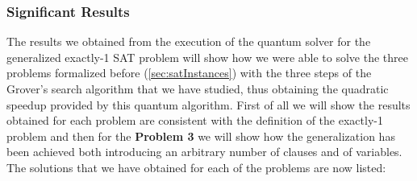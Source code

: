 \documentclass[english]{article}
\begin{document}
			\subsubsection{Significant Results}
			\label{sec:quantumResults}
				The results we obtained from the execution of the quantum solver for the generalized exactly-1 SAT problem will show how we were able to solve the three problems formalized before (\ref{sec:satInstances}) with the three steps of the Grover's search algorithm that we have studied, thus obtaining the quadratic speedup provided by this quantum algorithm. First of all we will show the results obtained for each problem are consistent with the definition of the exactly-1 problem and then for the \textbf{Problem 3} we will show how the generalization has been achieved both introducing an arbitrary number of clauses and of variables. The solutions that we have obtained for each of the problems are now listed:
\end{document}
